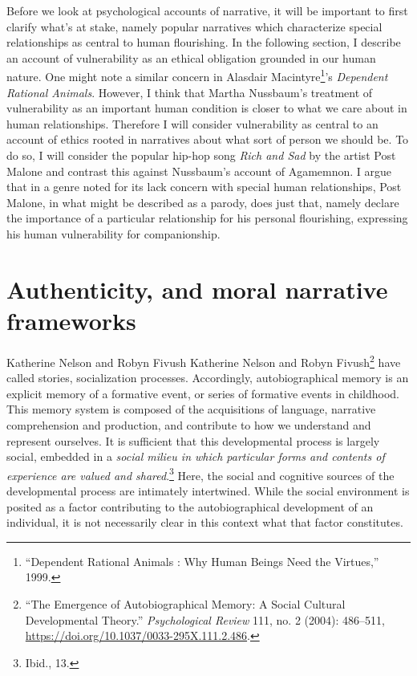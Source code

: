 \documentclass[phdthesis,12pt,final]{wuthesis}
\theoremstyle{definition}
\theoremstyle{definition}
\theoremstyle{definition}
\theoremstyle{definition}
\theoremstyle{remark}
\begin{document}
Before we look at psychological accounts of narrative, it will be important to first clarify what's at stake, namely popular narratives which characterize special relationships as central to human flourishing. In the following section, I describe an account of vulnerability as an ethical obligation grounded in our human nature. One might note a similar concern in Alasdair Macintyre\footnote{{``Dependent Rational Animals : Why Human Beings Need the Virtues,''} 1999.}'s \emph{Dependent Rational Animals}. However, I think that Martha Nussbaum's treatment of vulnerability as an important human condition is closer to what we care about in human relationships. Therefore I will consider vulnerability as central to an account of ethics rooted in narratives about what sort of person we should be. To do so, I will consider the popular hip-hop song \emph{Rich and Sad} by the artist Post Malone and contrast this against Nussbaum's account of Agamemnon. I argue that in a genre noted for its lack concern with special human relationships, Post Malone, in what might be described as a parody, does just that, namely declare the importance of a particular relationship for his personal flourishing, expressing his human vulnerability for companionship.

\section{Authenticity, and moral narrative frameworks}\label{authenticity-and-moral-narrative-frameworks}

Katherine Nelson and Robyn Fivush Katherine Nelson and Robyn Fivush\footnote{{``The {Emergence} of {Autobiographical Memory}: {A Social Cultural Developmental Theory}.''} \emph{Psychological Review} 111, no. 2 (2004): 486--511, \url{https://doi.org/10.1037/0033-295X.111.2.486}.} have called stories, socialization processes. Accordingly, autobiographical memory is an explicit memory of a formative event, or series of formative events in childhood. This memory system is composed of the acquisitions of language, narrative comprehension and production, and contribute to how we understand and represent ourselves. It is sufficient that this developmental process is largely social, embedded in a \emph{social milieu in which particular forms and contents of experience are valued and shared}.\footnote{Ibid., 13.} Here, the social and cognitive sources of the developmental process are intimately intertwined. While the social environment is posited as a factor contributing to the autobiographical development of an individual, it is not necessarily clear in this context what that factor constitutes.
\end{document}
